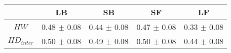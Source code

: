 \begin{tabular}{c c c c c }
\hline
 & LB & SB & SF & LF \\
\hline
$HW$ & 0.48 $\pm$ 0.08 & 0.44 $\pm$ 0.08 & 0.47 $\pm$ 0.08 & 0.33 $\pm$ 0.08 \\
$HD_{inter}$ & 0.50 $\pm$ 0.08 & 0.49 $\pm$ 0.08 & 0.50 $\pm$ 0.08 & 0.44 $\pm$ 0.08 \\
\hline
\end{tabular}
